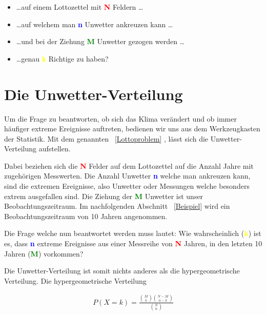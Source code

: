 \begin{refsection}
\begin{itemize}
\item \dots auf einem Lottozettel mit \textcolor{red}{\textbf{N}} Feldern \dots
\item \dots auf welchem man \textcolor{blue}{\textbf{n}} Unwetter ankreuzen kann \dots
\item \dots und bei der Ziehung \textcolor{green}{\textbf{M}} Unwetter gezogen werden \dots
\item \dots genau \textcolor{yellow}{\textbf{k}} Richtige zu haben?
\end{itemize}


\section{Die Unwetter-Verteilung}
Um die Frage zu beantworten, ob sich das Klima verändert und ob immer häufiger extreme Ereignisse auftreten, bedienen wir uns aus dem Werkzeugkasten der Statistik. Mit dem genannten ~\ref{Lottoproblem} , lässt sich die Unwetter-Verteilung aufstellen.

Dabei beziehen sich die \textcolor{red}{\textbf{N}} Felder auf dem Lottozettel auf die Anzahl Jahre mit zugehörigen Messwerten. Die Anzahl Unwetter \textcolor{blue}{\textbf{n}} welche man ankreuzen kann, sind die extremen Ereignisse, also Unwetter oder Messungen welche besonders extrem ausgefallen sind. Die Ziehung der \textcolor{green}{\textbf{M}} Unwetter ist unser Beobachtungszeitraum. Im nachfolgenden Abschnitt ~\ref{Beispiel}  wird ein Beobachtungszeitraum von 10 Jahren angenommen.


Die Frage welche nun beantwortet werden muss lautet:
Wie wahrscheinlich (\textcolor{yellow}{\textbf{k}}) ist es, dass \textcolor{blue}{\textbf{n}} extreme Ereignisse aus einer Messreihe von \textcolor{red}{\textbf{N}} Jahren, in den letzten 10 Jahren (\textcolor{green}{\textbf{M}}) vorkommen?




Die Unwetter-Verteilung ist somit nichts anderes als die hypergeometrische Verteilung. Die hypergeometrische Verteilung

\begin{align*}
P(X = k) = 
\frac{\displaystyle \binom{M}{k} \binom{N-M}{n-k}}{\displaystyle \binom{N}{n} }
\end{align*}


\end{refsection}
